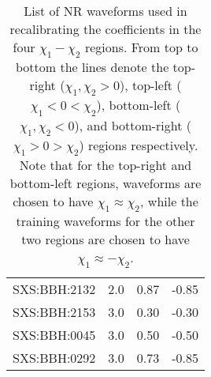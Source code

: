 \documentclass[twocolumn]{aastex631}
\begin{document}
\begin{table}[t]
\begin{tabularx}{0.8\columnwidth}{@{\extracolsep{\fill}}lrrr}
		SXS:BBH:2132 & 2.0 & 0.87     & -0.85    \\
		SXS:BBH:2153 & 3.0 & 0.30     & -0.30    \\
		SXS:BBH:0045 & 3.0 & 0.50     & -0.50    \\
		SXS:BBH:0292 & 3.0 & 0.73     & -0.85    \\ \midrule\bottomrule
	\end{tabularx}
	\caption{List of NR waveforms used in recalibrating the coefficients in the four $\chi_1-\chi_2$ regions.
	From top to bottom the lines denote the top-right ($\chi_1,\chi_2>0$), top-left ($\chi_1<0<\chi_2$),
	bottom-left ($\chi_1,\chi_2<0$), and bottom-right ($\chi_1>0>\chi_2$) regions respectively.
	Note that for the top-right and bottom-left regions, waveforms are chosen to have $\chi_1\approx\chi_2$,
	while the training waveforms for the other two regions are chosen to have $\chi_1\approx-\chi_2$.}
	\label{tab:quadrants}
\end{table}
\end{document}
